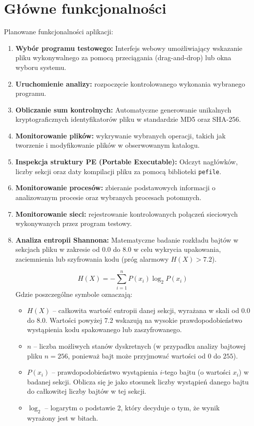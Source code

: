 \documentclass{article}
\begin{document}
\section{Główne funkcjonalności}
\label{sec:funkcjonalosci}
Planowane funkcjonalności aplikacji: 
\begin{enumerate}
\item \textbf{Wybór programu testowego:} Interfejs webowy umożliwiający wskazanie pliku wykonywalnego za pomocą przeciągania (drag-and-drop) lub okna wyboru systemu.
\item \textbf{Uruchomienie analizy:} rozpoczęcie kontrolowanego wykonania wybranego programu. 
\item \textbf{Obliczanie sum kontrolnych:} Automatyczne generowanie unikalnych kryptograficznych identyfikatorów pliku w standardzie MD5 oraz SHA-256.
\item \textbf{Monitorowanie plików:} wykrywanie wybranych operacji, takich jak tworzenie i modyfikowanie plików w obserwowanym katalogu. 
\item \textbf{Inspekcja struktury PE (Portable Executable):} Odczyt nagłówków, liczby sekcji oraz daty kompilacji pliku za pomocą biblioteki \texttt{pefile}.
\item \textbf{Monitorowanie procesów:} zbieranie podstawowych informacji o analizowanym procesie oraz wybranych procesach potomnych. 
\item \textbf{Monitorowanie sieci:} rejestrowanie kontrolowanych połączeń sieciowych wykonywanych przez program testowy. 
\item \textbf{Analiza entropii Shannona:} Matematyczne badanie rozkładu bajtów w sekcjach pliku w zakresie od $0.0$ do $8.0$ w celu wykrycia upakowania, zaciemnienia lub szyfrowania kodu (próg alarmowy $H(X) > 7.2$).

\begin{equation}
    H(X) = -\sum_{i=1}^{n} P(x_i) \log_2 P(x_i)
\end{equation}
Gdzie poszczególne symbole oznaczają:
\begin{itemize}
    \item \textbf{$H(X)$} – całkowita wartość entropii danej sekcji, wyrażana w skali od $0.0$ do $8.0$. Wartości powyżej $7.2$ wskazują na wysokie prawdopodobieństwo wystąpienia kodu spakowanego lub zaszyfrowanego.
    \item \textbf{$n$} – liczba możliwych stanów dyskretnych (w przypadku analizy bajtowej pliku $n = 256$, ponieważ bajt może przyjmować wartości od $0$ do $255$).
    \item \textbf{$P(x_i)$} – prawdopodobieństwo wystąpienia $i$-tego bajtu (o wartości $x_i$) w badanej sekcji. Oblicza się je jako stosunek liczby wystąpień danego bajtu do całkowitej liczby bajtów w tej sekcji.
    \item \textbf{$\log_2$} – logarytm o podstawie 2, który decyduje o tym, że wynik wyrażony jest w bitach.
\end{itemize}


\end{enumerate}
\end{document}
